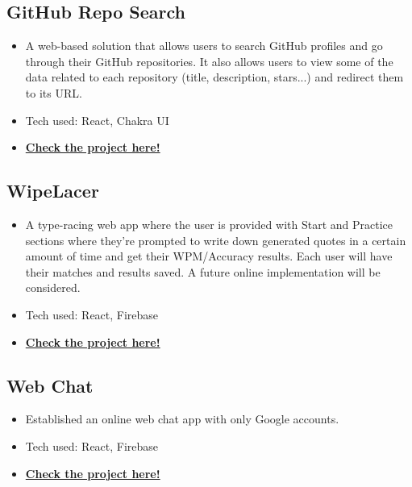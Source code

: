 \documentclass[a4,10pt]{article}
\newenvironment{zitemize}{
\begin{itemize}\itemsep0pt \parskip0pt \parsep1pt}
{\end{itemize}\vspace{-0.5cm}}
\begin{document}
\subsection*{GitHub Repo Search {\normalsize\normalfont} \hfill} 
    \begin{zitemize}
        \item A web-based solution that allows users to search GitHub profiles and go through their GitHub repositories. It also allows users to view some of the data related to each repository (title, description, stars...) and redirect them to its URL.
        \item Tech used: React, Chakra UI
         \item \href{https://mvst-project.netlify.app}{\small \textbf {Check the project here!}}
    \end{zitemize}

\subsection*{WipeLacer {\normalsize\normalfont} \hfill} 
    \begin{zitemize}
        \item A type-racing web app where the user is provided with Start and Practice sections where they're prompted to write down generated quotes in a certain amount of time and get their WPM/Accuracy results. Each user will have their matches and results saved. A future online implementation will be considered.
        \item Tech used: React, Firebase
         \item \href{https://wipelacer.vercel.app}{\small \textbf {Check the project here!}}
    \end{zitemize}

\subsection*{Web Chat {\normalsize\normalfont} \hfill} 
    \begin{zitemize}
        \item Established an online web chat app with only Google accounts.
        \item Tech used: React, Firebase
        \item \href{https://webchat-37001.firebaseapp.com}{\small \textbf {Check the project here!}}
        
    \end{zitemize}
   
\end{document}
